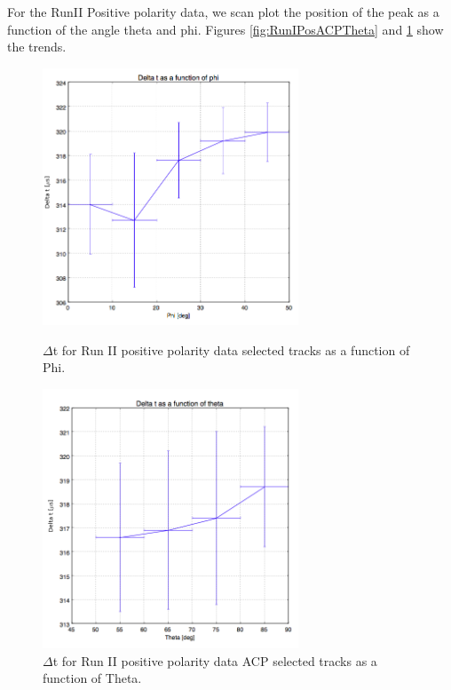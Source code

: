 For the RunII Positive polarity data, we scan plot the position of the peak as a function of the angle theta and phi. Figures \ref{fig:RunIPosACPTheta} and \ref{fig:RunIIPosACPPhi} show the trends.
\begin{figure}[b]
\centering
\begin{minipage}{0.45\textwidth}
\centering
\includegraphics[width=3in]{images/CollectionFitRunIIPosPhi.png}
\caption{$\Delta$t for Run II positive polarity data  selected tracks as a function of Phi. }
\label{fig:RunIPosACPTheta}
\end{minipage}\hfill
\begin{minipage}{0.45\textwidth}
\centering
\includegraphics[width=3in]{images/CollectionFitRunIIPosTheta.png}
\caption{$\Delta$t for Run II positive polarity data ACP selected tracks as a function of Theta.}
\label{fig:RunIIPosACPPhi}
\end{minipage}
\end{figure}
\clearpage
\newpage
